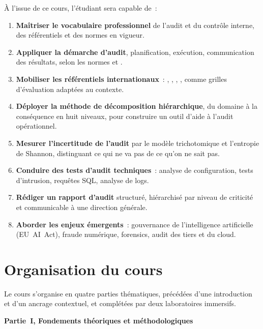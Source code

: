 \begin{boxobjectifs}
À l'issue de ce cours, l'étudiant sera capable de~:
\begin{enumerate}
    \item \textbf{Maîtriser le vocabulaire professionnel} de l'audit et du contrôle interne, des référentiels et des normes en vigueur.
    \item \textbf{Appliquer la démarche d'audit}, planification, exécution, communication des résultats, selon les normes  et .
    \item \textbf{Mobiliser les référentiels internationaux}~: , , , ,  comme grilles d'évaluation adaptées au contexte.
    \item \textbf{Déployer la méthode de décomposition hiérarchique}, du domaine à la conséquence en huit niveaux, pour construire un outil d'aide à l'audit opérationnel.
    \item \textbf{Mesurer l'incertitude de l'audit} par le modèle trichotomique  et l'entropie de Shannon, distinguant ce qui ne va pas de ce qu'on ne sait pas.
    \item \textbf{Conduire des tests d'audit techniques}~: analyse de configuration, tests d'intrusion, requêtes SQL, analyse de logs.
    \item \textbf{Rédiger un rapport d'audit} structuré, hiérarchisé par niveau de criticité et communicable à une direction générale.
    \item \textbf{Aborder les enjeux émergents}~: gouvernance de l'intelligence artificielle (EU~AI~Act), fraude numérique, forensics, audit des tiers et du cloud.
\end{enumerate}
\end{boxobjectifs}

\section*{Organisation du cours}

Le cours s'organise en quatre parties thématiques, précédées d'une introduction et d'un ancrage contextuel, et complétées par deux laboratoires immersifs.

\medskip
\noindent\textbf{Partie~I, Fondements théoriques et méthodologiques}

